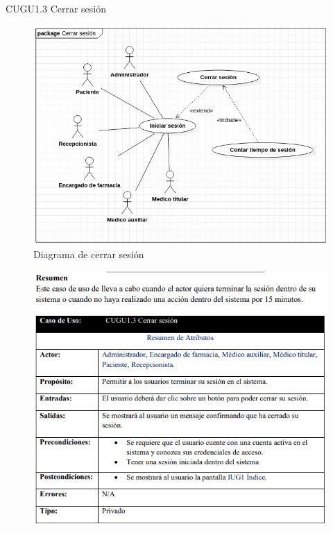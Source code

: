 \documentclass[12pt,letterpaper]{article}
\begin{document}
            \newpage
            CUGU1.3 Cerrar sesión 
            \begin{figure}[H]
                \centering
                \includegraphics [scale=0.3]{casosUso/cerrarSesion}
                \caption{Diagrama de cerrar sesión}
            \end{figure}
            \begin{figure}[H]
                \centering
                \includegraphics [scale=0.85]{specs/specCerrarSesion}
            \end{figure}
\end{document}
